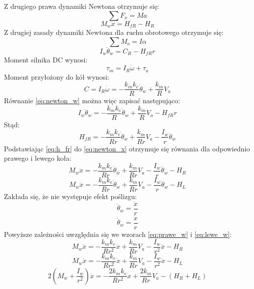 Z drugiego prawa dynamiki Newtona otrzymuje się:
\begin{equation}
\sum F_x=Ma
\end{equation}
\begin{equation}
M_w\ddot x=H_{fR}-H_R
\label{eq:newton_x}
\end{equation}
Z drugiej zasady dynamiki Newtona dla ruchu obrotowego otrzymuje się:
\begin{equation}
\sum M_o=I\alpha
\end{equation}
\begin{equation}
I_w\ddot \theta_w=C_R-H_{fR}r
\label{eq:newton_w}
\end{equation}
Moment silnika DC wynosi:
\begin{equation}
\tau_m=I_R\dot \omega+\tau_a
\label{eq:tau_m}
\end{equation}
Moment przyłożony do kół wynosi:
\begin{equation}
C=I_R\dot \omega=-\frac{k_mk_e}{R}\dot \theta_w+\frac{k_m}{R}V_a
\label{eq:C}
\end{equation}
Równanie \eqref{eq:newton_w} można więc zapisać następująco:
\begin{equation}
I_w\ddot \theta_w=-\frac{k_mk_e}{R}\dot \theta_w+\frac{k_m}{R}V_a-H_{fR}r
\end{equation}
Stąd:
\begin{equation}
H_{fR}=-\frac{k_mk_e}{Rr}\dot \theta_w+\frac{k_m}{Rr}V_a-\frac{I_w}{r}\ddot \theta_w
\label{eq:h_fr}
\end{equation}
Podstawiając \eqref{eq:h_fr} do \eqref{eq:newton_x} otrzymuje się równania dla odpowiednio prawego i lewego koła:
\begin{equation}
M_w\ddot x=-\frac{k_mk_e}{Rr}\dot \theta_w+\frac{k_m}{Rr}V_a-\frac{I_w}{r}\ddot \theta_w-H_R
\label{eq:prawe_w}
\end{equation}
\begin{equation}
M_w\ddot x=-\frac{k_mk_e}{Rr}\dot \theta_w+\frac{k_m}{Rr}V_a-\frac{I_w}{r}\ddot \theta_w-H_L
\label{eq:lewe_w}
\end{equation}
Zakłada się, że nie występuje efekt poślizgu:
\begin{equation}
\ddot \theta_w=\frac{\ddot x}{r}
\label{eq:dd_theta_w}
\end{equation}
\begin{equation}
\dot \theta_w=\frac{\dot x}{r}
\label{eq:d_theta_w}
\end{equation}
Powyższe zależności uwzględnia się we wzorach \eqref{eq:prawe_w} i \eqref{eq:lewe_w}:
\begin{equation}
M_w\ddot x=-\frac{k_mk_e}{Rr^2}\dot x+\frac{k_m}{Rr}V_a-\frac{I_w}{r^2}\ddot x-H_R
\label{eq:prawe_x}
\end{equation}
\begin{equation}
M_w\ddot x=-\frac{k_mk_e}{Rr^2}\dot x+\frac{k_m}{Rr}V_a-\frac{I_w}{r^2}\ddot x-H_L
\label{eq:lewe_x}
\end{equation}
\begin{equation}
2(M_w+\frac{I_w}{r^2})\ddot x=-\frac{2k_mk_e}{Rr^2}\dot x+\frac{2k_m}{Rr}V_a-(H_R+H_L)
\label{eq:total_x}
\end{equation}

